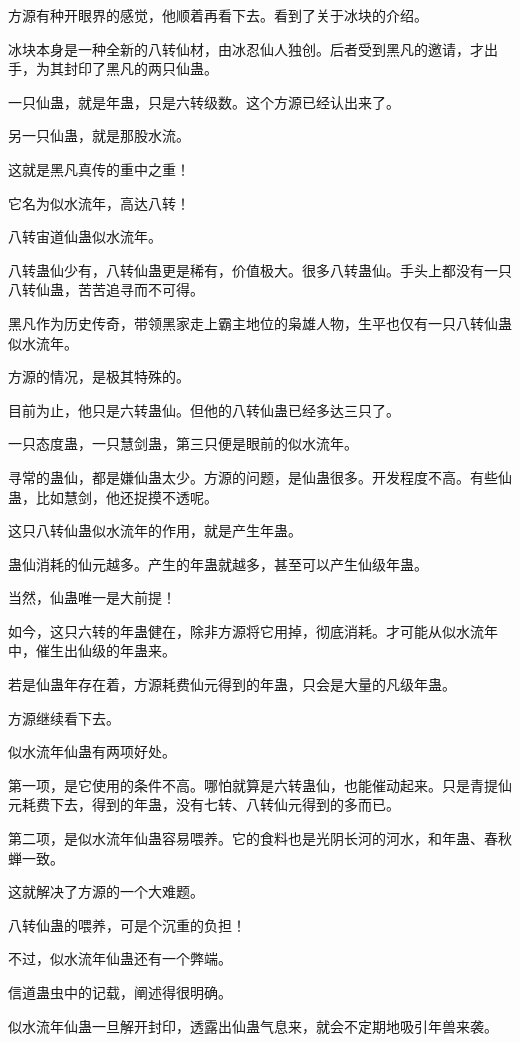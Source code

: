 \begin{this_body}
方源有种开眼界的感觉，他顺着再看下去。看到了关于冰块的介绍。

冰块本身是一种全新的八转仙材，由冰忍仙人独创。后者受到黑凡的邀请，才出手，为其封印了黑凡的两只仙蛊。

一只仙蛊，就是年蛊，只是六转级数。这个方源已经认出来了。

另一只仙蛊，就是那股水流。

这就是黑凡真传的重中之重！

它名为似水流年，高达八转！

八转宙道仙蛊似水流年。

八转蛊仙少有，八转仙蛊更是稀有，价值极大。很多八转蛊仙。手头上都没有一只八转仙蛊，苦苦追寻而不可得。

黑凡作为历史传奇，带领黑家走上霸主地位的枭雄人物，生平也仅有一只八转仙蛊似水流年。

方源的情况，是极其特殊的。

目前为止，他只是六转蛊仙。但他的八转仙蛊已经多达三只了。

一只态度蛊，一只慧剑蛊，第三只便是眼前的似水流年。

寻常的蛊仙，都是嫌仙蛊太少。方源的问题，是仙蛊很多。开发程度不高。有些仙蛊，比如慧剑，他还捉摸不透呢。

这只八转仙蛊似水流年的作用，就是产生年蛊。

蛊仙消耗的仙元越多。产生的年蛊就越多，甚至可以产生仙级年蛊。

当然，仙蛊唯一是大前提！

如今，这只六转的年蛊健在，除非方源将它用掉，彻底消耗。才可能从似水流年中，催生出仙级的年蛊来。

若是仙蛊年存在着，方源耗费仙元得到的年蛊，只会是大量的凡级年蛊。

方源继续看下去。

似水流年仙蛊有两项好处。

第一项，是它使用的条件不高。哪怕就算是六转蛊仙，也能催动起来。只是青提仙元耗费下去，得到的年蛊，没有七转、八转仙元得到的多而已。

第二项，是似水流年仙蛊容易喂养。它的食料也是光阴长河的河水，和年蛊、春秋蝉一致。

这就解决了方源的一个大难题。

八转仙蛊的喂养，可是个沉重的负担！

不过，似水流年仙蛊还有一个弊端。

信道蛊虫中的记载，阐述得很明确。

似水流年仙蛊一旦解开封印，透露出仙蛊气息来，就会不定期地吸引年兽来袭。


\end{this_body}
